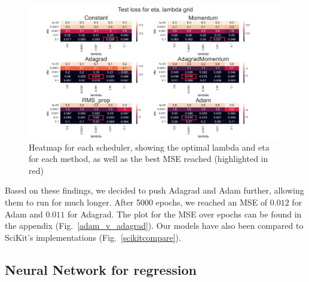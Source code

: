 \documentclass[onecolumn,10pt,cleanfoot]{asme2ej}
\begin{document}
\begin{figure}[H]
\centerline{\includegraphics[width=8in]{figure/fin_heatmap.png}}
\caption{Heatmap for each scheduler, showing the optimal lambda and eta for each method, as well as the best MSE reached (highlighted in red)}
\label{heatmap}
\end{figure}

Based on these findings, we decided to push Adagrad and Adam further, allowing them to run for much longer. After 5000 epochs, we reached an MSE of $0.012$ for Adam and $0.011$ for Adagrad. The plot for the MSE over epochs can be found in the appendix (Fig.~\ref{adam_v_adagrad}). Our models have also been compared to SciKit's implementations (Fig.~\ref{scikitcompare}).

\subsection{Neural Network for regression}
\end{document}
